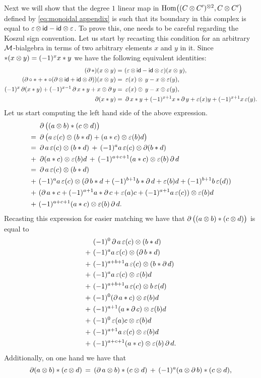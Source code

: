 Next we will show that the degree $1$ linear map in $\mathrm{Hom}\big((C \otimes C')^{\otimes 2}, C \otimes C'\big)$ defined by \cref{eq:monoidal appendix} is such that its boundary in this complex is equal to $\operatorname{\varepsilon} \otimes\, \mathsf{id} - \mathsf{id} \otimes \operatorname{\varepsilon}$.
To prove this, one needs to be careful regarding the Koszul sign convention.
Let us start by recasting this condition for an arbitrary $\mathcal{M}$-bialgebra in terms of two arbitrary elements $x$ and $y$ in it.
Since $\ast(x \otimes y) = (-1)^x x \ast y$ we have the following equivalent identities:
\begin{align*}
	(\bd \ast)(x \ot y) =\ & (\aug \ot\, \id - \id \ot \aug)(x \ot y), \\
	(\bd \circ \ast + \ast \circ (\bd \ot\, \id + \id \ot \bd))(x \ot y) =\ & \aug(x) \ot\, y - x \ot \aug(y), \\
	(-1)^x \bd (x \ast y) + (-1)^{x-1} \bd x \ast y + x \ot \bd y =\ & \aug(x) \ot\, y - x \ot \aug(y), \\
	\bd (x \ast y) =\ & \bdast{x}{y}.
\end{align*}
Let us start computing the left hand side of the above expression.
\begin{align*}&
	\bd\big((a \ot b) \ast (c \ot d)\big) \sk{=}
	\bd\big(a \aug(c) \ot (b \ast d) + (a \ast c) \ot \aug(b) d\big) \sk{=}
	\bd a \aug(c) \ot (b \ast d) \,+\, (-1)^{a} a \aug(c) \ot \bd(b \ast d) \sk{+}
	\bd (a \ast c) \ot \aug(b) d \,+\, (-1)^{a+c+1} (a \ast c) \ot \aug(b) \bd d \sk{=}
	\bd a \aug(c) \ot (b \ast d) \sk{+}
	(-1)^a a \aug(c) \ot (\bdast{b}{d}) \sk{+}
	(\bdast{a}{c}) \ot \aug(b) d \sk{+}
	(-1)^{a+c+1} (a \ast c) \ot \aug(b) \bd d.
\end{align*}
Recasting this expression for easier matching we have that $\operatorname{\partial}\big((a \otimes b) \ast (c \otimes d)\big)$ is equal to
\begin{align}& \label{x4}
	(-1)^0 \bd a \aug(c) \ot (b \ast d) \sk{+} \label{x5}
	(-1)^{a} a \aug(c) \ot (\bd b \ast d) \sk{+} \label{x6}
	(-1)^{a+b+1} a \aug(c) \ot (b \ast \bd d) \sk{+} \label{x7}
	(-1)^a a \aug(c) \ot \aug(b) d \sk{+} \label{x8}
	(-1)^{a+b+1} a \aug(c) \ot b \aug(d) \sk{+} \label{x9}
	(-1)^0 (\bd a \ast c) \ot \aug(b) d \sk{+} \label{x10}
	(-1)^{a+1} (a \ast \bd c) \ot \aug(b) d \sk{+} \label{x11}
	(-1)^0 \aug(a) c \ot \aug(b) d \sk{+} \label{x12}
	(-1)^{a+1} a \aug(c) \ot \aug(b) d \sk{+} \label{x13}
	(-1)^{a+c+1} (a \ast c) \ot \aug(b) \bd d.
\end{align}
Additionally, on one hand we have that
\begin{equation*}
	\operatorname{\partial} (a \otimes b) \ast (c \otimes d) \,=\,
	(\operatorname{\partial} a \otimes b) \ast (c \otimes d) \,+\,
	(-1)^a (a \otimes \operatorname{\partial} b) \ast (c \otimes d),
\end{equation*}
